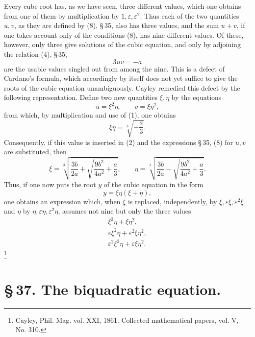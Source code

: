 \documentclass[11pt]{article}
\begin{document}
Every cube root has, as we have seen, three different values, which one obtains from one of them by multiplication by $1,\varepsilon,\varepsilon^2$. Thus each of the two quantities $u,v$, as they are defined by (8), \S\,35, also has three values, and the sum $u+v$, if one takes account only of the conditions (8), has nine different values. Of these, however, only three give solutions of the cubic equation, and only by adjoining the relation (4), \S\,35,
\begin{equation}
3uv=-a
\tag{1}
\end{equation}
are the usable values singled out from among the nine. This is a defect of Cardano's formula, which accordingly by itself does not yet suffice to give the roots of the cubic equation unambiguously. Cayley remedied this defect by the following representation. Define two new quantities $\xi,\eta$ by the equations
\begin{equation}
u=\xi^2\eta,
\qquad
v=\xi\eta^2,
\tag{2}
\end{equation}
from which, by multiplication and use of (1), one obtains
\begin{equation}
\xi\eta=\sqrt[3]{-\frac a3}.
\tag{3}
\end{equation}
Consequently, if this value is inserted in (2) and the expressions \S\,35, (8) for $u,v$ are substituted, then
\begin{equation}
\xi=\sqrt[3]{\frac{3b}{2a}+\sqrt{\frac{9b^2}{4a^2}+\frac a3}},\qquad
\eta=\sqrt[3]{\frac{3b}{2a}-\sqrt{\frac{9b^2}{4a^2}+\frac a3}}.
\tag{4}
\end{equation}
Thus, if one now puts the root $y$ of the cubic equation in the form
\begin{equation}
y=\xi\eta(\xi+\eta),
\tag{5}
\end{equation}
one obtains an expression which, when $\xi$ is replaced, independently, by $\xi,\varepsilon\xi,\varepsilon^2\xi$ and $\eta$ by $\eta,\varepsilon\eta,\varepsilon^2\eta$, assumes not nine but only the three values
\[
\begin{array}{c}
\xi^2\eta+\xi\eta^2,\\
\varepsilon\xi^2\eta+\varepsilon^2\xi\eta^2,\\
\varepsilon^2\xi^2\eta+\varepsilon\xi\eta^2.
\end{array}
\]
\footnote{Cayley, Phil. Mag. vol. XXI, 1861. Collected mathematical papers, vol. V, No. 310.}



\section*{\S\,37. The biquadratic equation.}
\end{document}
